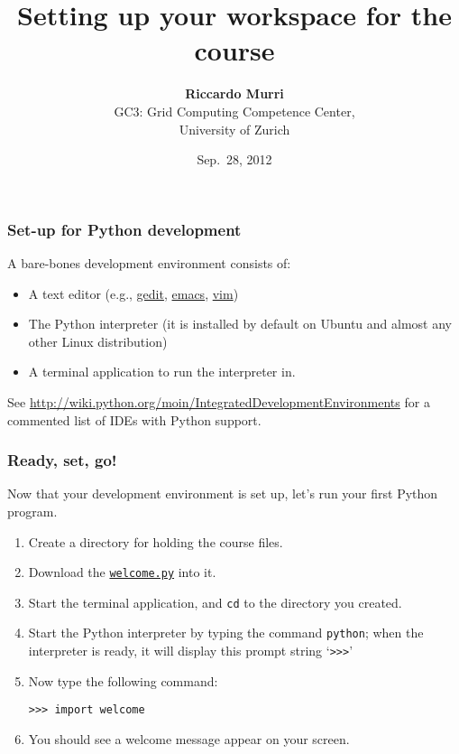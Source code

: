 \documentclass[english,serif,mathserif,xcolor=pdftex,dvipsnames,table]{beamer}
\title[Set-up]{%
  Setting up your workspace for the course
}
\author[R. Murri]{%
  \textbf{Riccardo Murri} \\
  GC3: Grid Computing Competence Center, \\
  University of Zurich
}
\date{Sep.~28, 2012}
\begin{document}
\maketitle


\begin{frame}
  \frametitle{Set-up for Python development}
  A bare-bones development environment consists of:
  \begin{itemize}
  \item A text editor (e.g.,
    \href{http://en.wikipedia.org/wiki/Gedit}{gedit}, 
    \href{http://hide1713.wordpress.com/2009/01/30/setup-perfect-python-environment-in-emacs/}{emacs},
    \href{http://blog.dispatched.ch/2009/05/24/vim-as-python-ide/}{vim})
  \item The Python interpreter (it is installed by default on
    Ubuntu and almost any other Linux distribution)
  \item A terminal application to run the interpreter in.
  \end{itemize}

  \+ See
  {\small \url{http://wiki.python.org/moin/IntegratedDevelopmentEnvironments}}
  for a commented list of {IDEs} with Python support.
\end{frame}


\begin{frame}[fragile]
  \frametitle{Ready, set, go!}

  Now that your development environment is set up, let's run your
  first Python program.
  \begin{enumerate}
  \item Create a directory for holding the course files.
  \item Download the \href{http://www.gc3.uzh.ch/welcome.py}{\texttt{welcome.py}} into it.
  \item Start the terminal application, and \texttt{cd} to the directory you created.
  \item Start the Python interpreter by typing the command \texttt{python}; when the interpreter is ready, it will display this prompt string `\texttt{>>>}'
  \item Now type the following command:
    \begin{lstlisting}
>>> import welcome      
    \end{lstlisting}
  \item You should see a welcome message appear on your screen.
  \end{enumerate}
  
\end{frame}
\end{document}
